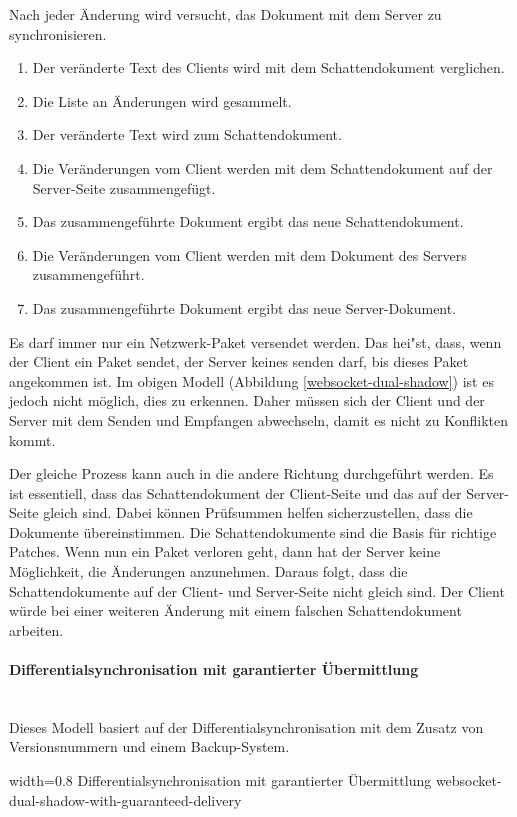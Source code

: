Nach jeder Änderung wird versucht, das Dokument mit dem Server zu synchronisieren.

\begin{enumerate}
	\item Der veränderte Text des Clients wird mit dem Schattendokument verglichen.
	\item Die Liste an Änderungen wird gesammelt.
	\item Der veränderte Text wird zum Schattendokument.
	\item Die Veränderungen vom Client werden mit dem Schattendokument auf der Server-Seite zusammengefügt.
	\item Das zusammengeführte Dokument ergibt das neue Schattendokument.
	\item Die Veränderungen vom Client werden mit dem Dokument des Servers zusammengeführt.
	\item Das zusammengeführte Dokument ergibt das neue Server-Dokument.
\end{enumerate}

Es darf immer nur ein Netzwerk-Paket versendet werden. Das hei"st, dass, wenn der Client ein Paket sendet, der Server keines senden darf, bis dieses Paket angekommen ist. Im obigen Modell (Abbildung \ref{websocket-dual-shadow}) ist es jedoch nicht möglich, dies zu erkennen. Daher müssen sich der Client und der Server mit dem Senden und Empfangen abwechseln, damit es nicht zu Konflikten kommt.

Der gleiche Prozess kann auch in die andere Richtung durchgeführt werden. Es ist essentiell, dass das Schattendokument der Client-Seite und das auf der Server-Seite gleich sind. Dabei können Prüfsummen helfen sicherzustellen, dass die Dokumente übereinstimmen. Die Schattendokumente sind die Basis für richtige Patches. Wenn nun ein Paket verloren geht, dann hat der Server keine Möglichkeit, die Änderungen anzunehmen. Daraus folgt, dass die Schattendokumente auf der Client- und Server-Seite nicht gleich sind. Der Client würde bei einer weiteren Änderung mit einem falschen Schattendokument arbeiten.

\paragraph{Differentialsynchronisation mit garantierter Übermittlung}~\\
Dieses Modell basiert auf der Differentialsynchronisation mit dem Zusatz von Versionsnummern und einem Backup-System.

{width=0.8\linewidth}
{Differentialsynchronisation mit garantierter Übermittlung \cite{websocket-differential}}
{websocket-dual-shadow-with-guaranteed-delivery}

